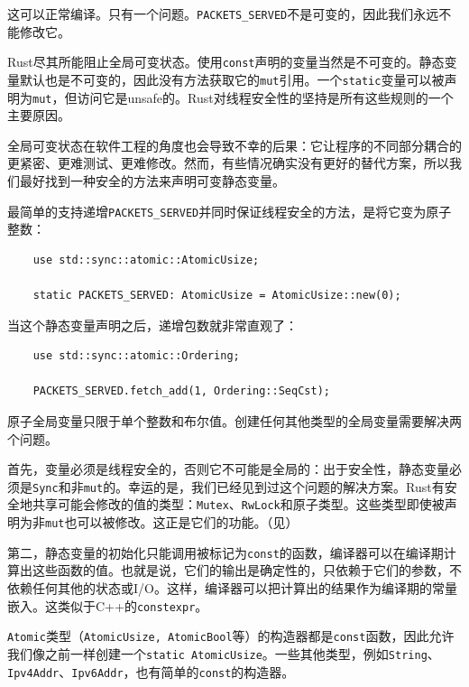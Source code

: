 这可以正常编译。只有一个问题。\texttt{PACKETS\_SERVED}不是可变的，因此我们永远不能修改它。

Rust尽其所能阻止全局可变状态。使用\texttt{const}声明的变量当然是不可变的。静态变量默认也是不可变的，因此没有方法获取它的\texttt{mut}引用。一个\texttt{static}变量可以被声明为\texttt{mut}，但访问它是unsafe的。Rust对线程安全性的坚持是所有这些规则的一个主要原因。

全局可变状态在软件工程的角度也会导致不幸的后果：它让程序的不同部分耦合的更紧密、更难测试、更难修改。然而，有些情况确实没有更好的替代方案，所以我们最好找到一种安全的方法来声明可变静态变量。

最简单的支持递增\texttt{PACKETS\_SERVED}并同时保证线程安全的方法，是将它变为原子整数：
\begin{verbatim}
    use std::sync::atomic::AtomicUsize;

    static PACKETS_SERVED: AtomicUsize = AtomicUsize::new(0);
\end{verbatim}

当这个静态变量声明之后，递增包数就非常直观了：
\begin{verbatim}
    use std::sync::atomic::Ordering;

    PACKETS_SERVED.fetch_add(1, Ordering::SeqCst);
\end{verbatim}

原子全局变量只限于单个整数和布尔值。创建任何其他类型的全局变量需要解决两个问题。

首先，变量必须是线程安全的，否则它不可能是全局的：出于安全性，静态变量必须是\texttt{Sync}和非\texttt{mut}的。幸运的是，我们已经见到过这个问题的解决方案。Rust有安全地共享可能会修改的值的类型：\texttt{Mutex}、\texttt{RwLock}和原子类型。这些类型即使被声明为非\texttt{mut}也可以被修改。这正是它们的功能。（见）

第二，静态变量的初始化只能调用被标记为\texttt{const}的函数，编译器可以在编译期计算出这些函数的值。也就是说，它们的输出是确定性的，只依赖于它们的参数，不依赖任何其他的状态或I/O。这样，编译器可以把计算出的结果作为编译期的常量嵌入。这类似于C++的\texttt{constexpr}。

\texttt{Atomic}类型（\texttt{AtomicUsize, AtomicBool}等）的构造器都是\texttt{const}函数，因此允许我们像之前一样创建一个\texttt{static AtomicUsize}。一些其他类型，例如\texttt{String}、\texttt{Ipv4Addr}、\texttt{Ipv6Addr}，也有简单的\texttt{const}的构造器。

